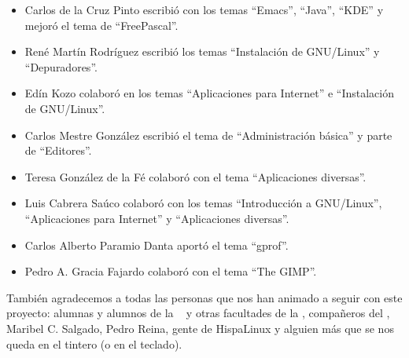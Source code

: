 \begin{itemize}
\item {\sc Carlos de la Cruz  Pinto} escribió con los temas ``Emacs'',
``Java'', ``KDE'' y mejoró el tema de ``FreePascal''.

\item {\sc René Martín Rodríguez}  escribió los temas ``Instalación de
GNU/Linux'' y ``Depuradores''.

\item  {\sc  Edín Kozo}  colaboró  en  los temas  ``Aplicaciones  para
Internet'' e ``Instalación de GNU/Linux''.

\item   {\sc   Carlos   Mestre   González}   escribió   el   tema   de
``Administración básica'' y parte de ``Editores''.

\item  {\sc   Teresa  González  de   la  Fé}  colaboró  con   el  tema
``Aplicaciones diversas''.

\item {\sc Luis  Cabrera Saúco} colaboró con  los temas ``Introducción
a  GNU/Linux'',   ``Aplicaciones  para  Internet''   y  ``Aplicaciones
diversas''.

\item  {\sc Carlos  Alberto  Paramio Danta}  aportó  %
el tema ``gprof''.

\item {\sc Pedro A. Gracia Fajardo} colaboró con el tema ``The GIMP''.


\end{itemize}

También agradecemos a todas las personas  que nos han animado a seguir
con este proyecto:  alumnas y alumnos de la \FMAT~  y otras facultades
de la  \ULL, compañeros del  \GULiC, Maribel C. Salgado,  Pedro Reina,
gente de {\sc \mbox{HispaLinux}} y alguien  más que se nos queda en el
tintero (o en el teclado).


